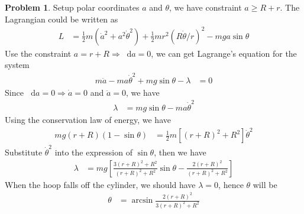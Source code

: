 \documentclass[twoside,11pt]{article}
\newcommand{\lms}{\fontfamily{lmss}\selectfont} %
\renewcommand*\d{\mathop{}\!\mathrm{d}}
\theoremstyle{definition}
\newtheorem{problem}{\lms Problem}
\theoremstyle{remark}
\begin{document}
\begin{problem}
Setup polar coordinates $a$ and $\theta$,
we have constraint $a\geq R+r$.
The Lagrangian could be written as
\begin{align*}
    L &= \frac{1}{2}m(\dot{a}^2 + a^2\dot{\theta}^2) + \frac{1}{2}mr^2(R\dot{\theta}/r)^2 - mga\sin\theta
\end{align*}
Use the constraint $a = r+R\Rightarrow \d a = 0$, we can get Lagrange's equation for the system
\begin{align*}
    m\ddot{a} - ma\dot{\theta}^2 + mg\sin\theta - \lambda &= 0
\end{align*}
Since $\d a = 0\Rightarrow\dot{a} = 0$ and $\ddot{a}=0$, we have
\begin{align*}
    \lambda &= 
    mg\sin\theta - ma\dot{\theta}^2
\end{align*}
Using the conservation law of energy, we have
\begin{align*}
    mg(r+R)(1-\sin\theta) &= 
    \frac{1}{2}m[(r+R)^2 + R^2]\dot{\theta}^2
\end{align*}
Substitute $\dot{\theta}^2$ into the expression of $\sin\theta$, then we have
\begin{align*}
    \lambda &= 
    mg\left[
        \frac{3(r+R)^2+R^2}{(r+R)^2+R^2}\sin\theta - \frac{2(r+R)^2}{(r+R)^2+R^2}
    \right]
\end{align*}
When the hoop falls off the cylinder, we should have $\lambda=0$, hence $\theta$ will be
\begin{align*}
    \theta &= \arcsin\frac{2(r+R)^2}{3(r+R)^2+R^2}
\end{align*}
\end{problem}




\end{document}
